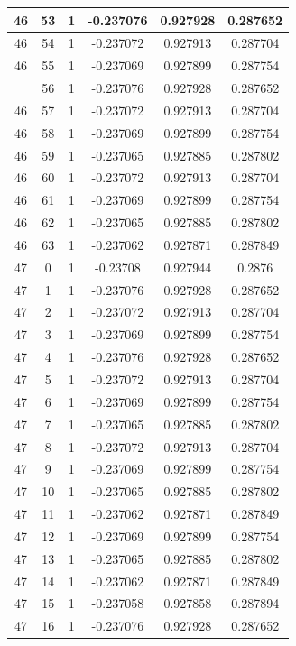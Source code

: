 \documentclass[12pt,a4paper]{article}
\numberwithin{equation}{section}
\numberwithin{figure}{section}
\numberwithin{table}{section}
\begin{document}
\begin{longtable}{|c|c|c|c|c|c|}
46 & 53 & 1 & -0.237076 & 0.927928 & 0.287652 \\ \hline
46 & 54 & 1 & -0.237072 & 0.927913 & 0.287704 \\ \hline
46 & 55 & 1 & -0.237069 & 0.927899 & 0.287754 \\ \hline
\pagebreak
46 & 56 & 1 & -0.237076 & 0.927928 & 0.287652 \\ \hline
46 & 57 & 1 & -0.237072 & 0.927913 & 0.287704 \\ \hline
46 & 58 & 1 & -0.237069 & 0.927899 & 0.287754 \\ \hline
46 & 59 & 1 & -0.237065 & 0.927885 & 0.287802 \\ \hline
46 & 60 & 1 & -0.237072 & 0.927913 & 0.287704 \\ \hline
46 & 61 & 1 & -0.237069 & 0.927899 & 0.287754 \\ \hline
46 & 62 & 1 & -0.237065 & 0.927885 & 0.287802 \\ \hline
46 & 63 & 1 & -0.237062 & 0.927871 & 0.287849 \\ \hline
47 & 0 & 1 & -0.23708 & 0.927944 & 0.2876 \\ \hline
47 & 1 & 1 & -0.237076 & 0.927928 & 0.287652 \\ \hline
47 & 2 & 1 & -0.237072 & 0.927913 & 0.287704 \\ \hline
47 & 3 & 1 & -0.237069 & 0.927899 & 0.287754 \\ \hline
47 & 4 & 1 & -0.237076 & 0.927928 & 0.287652 \\ \hline
47 & 5 & 1 & -0.237072 & 0.927913 & 0.287704 \\ \hline
47 & 6 & 1 & -0.237069 & 0.927899 & 0.287754 \\ \hline
47 & 7 & 1 & -0.237065 & 0.927885 & 0.287802 \\ \hline
47 & 8 & 1 & -0.237072 & 0.927913 & 0.287704 \\ \hline
47 & 9 & 1 & -0.237069 & 0.927899 & 0.287754 \\ \hline
47 & 10 & 1 & -0.237065 & 0.927885 & 0.287802 \\ \hline
47 & 11 & 1 & -0.237062 & 0.927871 & 0.287849 \\ \hline
47 & 12 & 1 & -0.237069 & 0.927899 & 0.287754 \\ \hline
47 & 13 & 1 & -0.237065 & 0.927885 & 0.287802 \\ \hline
47 & 14 & 1 & -0.237062 & 0.927871 & 0.287849 \\ \hline
47 & 15 & 1 & -0.237058 & 0.927858 & 0.287894 \\ \hline
47 & 16 & 1 & -0.237076 & 0.927928 & 0.287652 \\ \hline

\end{longtable}
\end{document}
